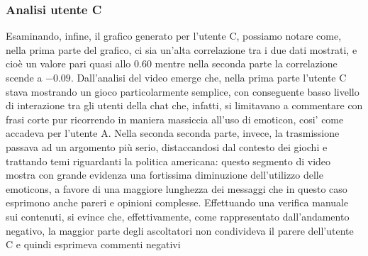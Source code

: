 \documentclass[a4paper,12pt,openright,twoside]{report}
\theoremstyle{definition}
\begin{document}
\subsubsection{Analisi utente C}
Esaminando, infine, il grafico generato per l'utente C, possiamo notare come, nella prima
parte del grafico, ci sia un'alta correlazione tra i due dati mostrati,
e cioè un valore pari quasi allo $0.60$ mentre nella
seconda parte la correlazione scende a $-0.09$. 
Dall'analisi del video emerge che, nella prima parte l'utente C
stava mostrando un gioco particolarmente semplice, con conseguente basso livello di interazione tra gli utenti
della chat che, infatti, si limitavano a commentare con frasi corte
pur ricorrendo in maniera massiccia all'uso di emoticon, cosi' 
come accadeva per l'utente A. 
Nella seconda seconda parte, invece, la trasmissione passava ad un argomento più serio,
distaccandosi dal contesto dei giochi e trattando temi riguardanti la politica americana:
questo segmento di video mostra con grande evidenza una fortissima diminuzione dell'utilizzo
delle emoticons, a favore di una maggiore lunghezza dei messaggi che in questo caso
esprimono anche pareri e opinioni complesse. 
Effettuando una verifica manuale sui contenuti,
si evince che, effettivamente, come rappresentato dall'andamento negativo, la maggior parte degli ascoltatori
non condivideva il parere dell'utente C e quindi esprimeva commenti negativi

\end{document}
